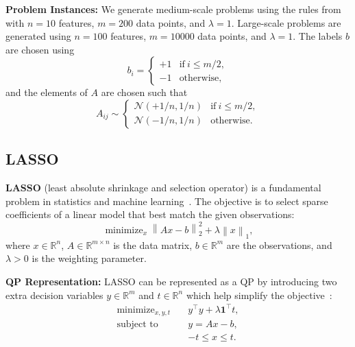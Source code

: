 \documentclass{article} %
\newcommand{\R}{\mathbb{R}}
\DeclareMathOperator*{\minimize}{minimize}
\DeclareMathOperator*{\st}{subject\ to}
\newcommand{\norm}[1]{\left\lVert#1\right\rVert}
\begin{document}
\textbf{Problem Instances:} We generate medium-scale problems using the rules from \citet{stellato2020osqp} with $n = 10$ features, $m = 200$ data points, and $\lambda = 1$.
Large-scale problems are generated using $n = 100$ features, $m = 10000$ data points, and $\lambda = 1$.
The labels $b$ are chosen using
\begin{equation}
    b_i = \begin{cases}
        +1 & \text{if} \ i \leq m / 2, \\
        -1 & \text{otherwise},
    \end{cases}
\end{equation}
and the elements of $A$ are chosen such that
\begin{equation}
    A_{ij} \sim \begin{cases}
        \mathcal{N}(+1/n, 1/n) & \text{if} \ i \leq m / 2, \\
        \mathcal{N}(-1/n, 1/n) & \text{otherwise}.
    \end{cases}
\end{equation}

\subsection{LASSO}

\textbf{LASSO} (least absolute shrinkage and selection operator) is a fundamental problem in statistics and machine learning~\citep{tibshirani1996regression,candes2008enhancing}. The objective is to select sparse coefficients of a linear model that best match the given observations:
\begin{equation}
    \minimize_x \norm{Ax - b}_2^2 + \lambda \norm{x}_1,
\end{equation}
where $x \in \R^n$, $A \in \R^{m \times n}$ is the data matrix, $b \in \R^m$ are the observations, and $\lambda > 0$ is the weighting parameter.

\textbf{QP Representation:} LASSO can be represented as a QP by introducing two extra decision variables $y \in \mathbb{R}^m$ and $t \in \mathbb{R}^n$ which help simplify the objective~\citep{stellato2020osqp}:
\begin{subequations}
\begin{align}
    \minimize_{x, y, t} \quad    & y^\top y + \lambda \mathbf{1}^\top t, \\
    \st \quad & y = Ax - b, \\
                            & -t \leq x \leq t.
\end{align}
\end{subequations}
\end{document}
